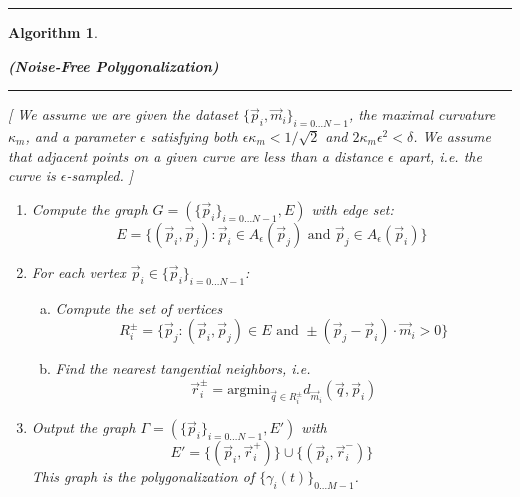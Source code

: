 \documentclass{article}
\newtheorem{algo}{Algorithm}
\numberwithin{cntr}{section}
\numberwithin{equation}{section}
\newcommand{\vp}[0]{{\vec{p}}}
\newcommand{\vq}[0]{{\vec{q}}}
\newcommand{\vr}[0]{{\vec{r}}}
\newcommand{\vm}[0]{{\vec{m}}}
\newcommand{\Oto}[1]{{0 \ldots #1-1}}
\newcommand{\OtoN}{{0 \ldots N-1}}
\newcommand{\pointData}{{ \{ \vp_{i} \}_{i=\OtoN} }}
\newcommand{\allData}{{ \{ \vp_{i}, \vm_{i} \}_{i=\OtoN} }}
\newcommand{\curveSet}{{ \{ \gamma_i(t) \}_{\Oto{M}}}}
\newcommand{\allowed}[2]{ { A_{#1}(#2) } }
\newcommand{\curvemax}{{\kappa_{m}}}
\newcommand{\curvesep}{{\delta}}
\begin{document}
\vspace{.2in}

\hrule
\begin{algo}
  \label{algo:polygonalization}
  \begin{center} {\bf (Noise-Free Polygonalization)}
  \end{center}

\vspace{.1in}

\hrule

\vspace{.2in}

[ We assume we are given
the dataset $\allData$,
the maximal curvature $\curvemax$, and
a parameter $\epsilon$ satisfying both
$\epsilon \curvemax < 1/\sqrt{2}$ and $2 \curvemax \epsilon^{2} < \curvesep$.
We assume that adjacent points on a given curve
are less than a distance $\epsilon$ apart, i.e. the curve is
$\epsilon$-sampled. ]

\vspace{.1in}

  \begin{enumerate}
  \item Compute the graph $G = (\pointData, E)$ with edge set:
    \begin{equation*}
      E = \{ (\vp_{i},\vp_{j}) : \vp_{i} \in \allowed{\epsilon}{\vp_{j}} \textrm{~and~} \vp_{j} \in \allowed{\epsilon}{\vp_{i}}\}
    \end{equation*}
  \item For each vertex $\vp_{i} \in \pointData$:
    \begin{enumerate}[a.]
    \item Compute the set of vertices
      \begin{equation*}
        R^{\pm}_{i} = \{ \vp_{j} : (\vp_{i}, \vp_{j}) \in E \textrm{~and~} \pm (\vp_{j}-\vp_{i}) \cdot \vm_{i} > 0 \}
      \end{equation*}
    \item Find the nearest tangential neighbors, i.e.
      \begin{equation*}
        \vr^{\pm}_{i} = \textrm{argmin}_{\vq \in R^{\pm}_{i}} d_{\vm_{i}}(\vq, \vp_{i})
      \end{equation*}
    \end{enumerate}
  \item Output the graph $\Gamma = ( \pointData, E')$ with
    \begin{equation*}
      E' = \{ (\vp_{i}, \vr^{+}_{i}) \} \cup \{ (\vp_{i}, \vr^{-}_{i}) \}
    \end{equation*}
    This graph is the polygonalization of $\curveSet$.
  \end{enumerate}

\end{algo}
\end{document}
